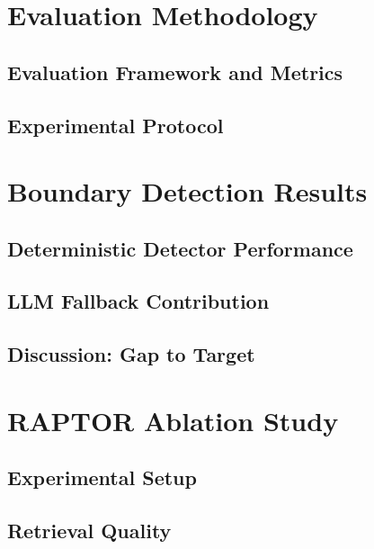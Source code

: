 \documentclass[12pt,a4paper]{report}
\begin{document}
\section{Evaluation Methodology}
\label{sec:eval-methodology}

  \subsection{Evaluation Framework and Metrics}
  \label{subsec:metrics}

  \subsection{Experimental Protocol}
  \label{subsec:experimental-protocol}

\section{Boundary Detection Results}
\label{sec:boundary-results}

  \subsection{Deterministic Detector Performance}
  \label{subsec:det-perf}

  \subsection{LLM Fallback Contribution}
  \label{subsec:llm-boundary-contribution}

  \subsection{Discussion: Gap to Target}
  \label{subsec:boundary-gap}

\section{RAPTOR Ablation Study}
\label{sec:raptor-results}

  \subsection{Experimental Setup}
  \label{subsec:ablation-setup}

  \subsection{Retrieval Quality}
  \label{subsec:retrieval-quality}
\end{document}
